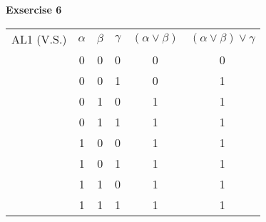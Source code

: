 \documentclass[a4paper, 12pt]{article}  %
\begin{document}
\textbf{Exsercise 6}
\begin{table}[H]
    \begin{tabular}{c|c|c|c|c|c|}
        AL1 (V.S.) & $\alpha$ & $\beta$ & $\gamma$ & $(\alpha \lor \beta)$ & $(\alpha \lor \beta) \lor \gamma $ \\
                   & 0        & 0       & 0        & 0                     & 0                                  \\
                   & 0        & 0       & 1        & 0                     & 1                                  \\
                   & 0        & 1       & 0        & 1                     & 1                                  \\
                   & 0        & 1       & 1        & 1                     & 1                                  \\
                   & 1        & 0       & 0        & 1                     & 1                                  \\
                   & 1        & 0       & 1        & 1                     & 1                                  \\
                   & 1        & 1       & 0        & 1                     & 1                                  \\
                   & 1        & 1       & 1        & 1                     & 1                                  \\
    \end{tabular}
\end{table}
\end{document}
